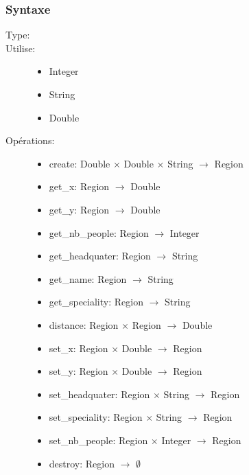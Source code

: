 \subsubsection{Syntaxe}
\begin{description}
  \item[Type:]
  \item[Utilise:]\indent
    \begin{itemize}
      \item Integer
      \item String
      \item Double
    \end{itemize}
  \item[Opérations:]\indent
    \begin{itemize}
      \item create: Double $\times$ Double $\times$ String $\to$ Region
      \item get\_x: Region $\to$ Double
      \item get\_y: Region $\to$ Double
      \item get\_nb\_people: Region $\to$ Integer
      \item get\_headquater: Region $\to$ String
      \item get\_name: Region $\to$ String
      \item get\_speciality: Region $\to$ String
      \item distance: Region $\times$ Region $\to$ Double
      \item set\_x: Region $\times$ Double $\to$ Region
      \item set\_y: Region $\times$ Double $\to$ Region
      \item set\_headquater: Region $\times$ String $\to$ Region
      \item set\_speciality: Region $\times$ String $\to$ Region
      \item set\_nb\_people: Region $\times$ Integer $\to$ Region
      \item destroy: Region $\to$ $\emptyset$
    \end{itemize}
\end{description}

